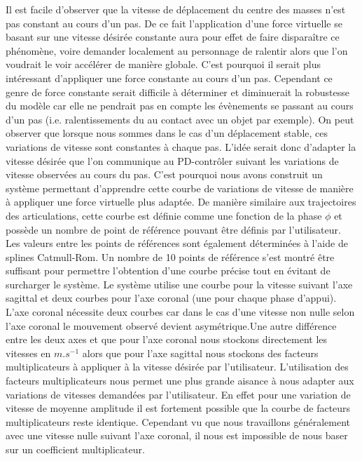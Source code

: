 \documentclass[runningheads,a4paper]{llncs}
\begin{document}
Il est facile d'observer que la vitesse de déplacement du centre des masses n'est pas constant au cours d'un pas. De ce fait l'application d'une force virtuelle se basant sur une vitesse désirée constante aura pour effet de faire disparaître ce phénomène, voire demander localement au personnage de ralentir alors que l'on voudrait le voir accélérer de manière globale. C'est pourquoi il serait plus intéressant d'appliquer une force constante au cours d'un pas. Cependant ce genre de force constante serait difficile à déterminer et diminuerait la robustesse du modèle car elle ne pendrait pas en compte les évènements se passant au cours d'un pas (i.e. ralentissements du au contact avec un objet par exemple). On peut observer que lorsque nous sommes dans le cas d'un déplacement stable, ces variations de vitesse sont constantes à chaque pas. L'idée serait donc d'adapter la vitesse désirée que l'on communique au PD-contrôler suivant les variations de vitesse observées au cours du pas. C'est pourquoi nous avons construit un système permettant d'apprendre cette courbe de variations de vitesse de manière à appliquer une force virtuelle plus adaptée. De manière similaire aux trajectoires des articulations, cette courbe est définie comme une fonction de la phase \(\phi\) et possède un nombre de point de référence pouvant être définis par l'utilisateur. Les valeurs entre les points de références sont également déterminées à l'aide de splines Catmull-Rom. Un nombre de 10 points de référence s'est montré être suffisant pour permettre l'obtention d'une courbe précise tout en évitant de surcharger le système. Le système utilise une courbe pour la vitesse suivant l'axe sagittal et deux courbes pour l'axe coronal (une pour chaque phase d'appui). L'axe coronal nécessite deux courbes car dans le cas d'une vitesse non nulle selon l'axe coronal le mouvement observé devient asymétrique.Une autre différence entre les deux axes et que pour l'axe coronal nous stockons directement les vitesses en $m.s^{-1}$ alors que pour l'axe sagittal nous stockons des facteurs multiplicateurs à appliquer à la vitesse désirée par l'utilisateur. L'utilisation des facteurs multiplicateurs nous permet une plus grande aisance à nous adapter aux variations de vitesses demandées par l'utilisateur. En effet pour une variation de vitesse de moyenne amplitude il est fortement possible que la courbe de facteurs multiplicateurs reste identique. Cependant vu que nous travaillons généralement avec une vitesse nulle suivant l'axe coronal, il nous est impossible de nous baser sur un coefficient multiplicateur.
\end{document}
